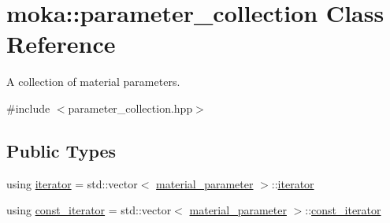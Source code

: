 \hypertarget{classmoka_1_1parameter__collection}{}\section{moka\+::parameter\+\_\+collection Class Reference}
\label{classmoka_1_1parameter__collection}


A collection of material parameters.  




{\ttfamily \#include $<$parameter\+\_\+collection.\+hpp$>$}

\subsection*{Public Types}
\begin{DoxyCompactItemize}
\item 
using \mbox{\hyperlink{classmoka_1_1parameter__collection_a2ec8bed3c1d7de9e5c2199ede27aa919}{iterator}} = std\+::vector$<$ \mbox{\hyperlink{structmoka_1_1material__parameter}{material\+\_\+parameter}} $>$\+::\mbox{\hyperlink{classmoka_1_1parameter__collection_a2ec8bed3c1d7de9e5c2199ede27aa919}{iterator}}
\item 
using \mbox{\hyperlink{classmoka_1_1parameter__collection_a6d2ad87d4e43742300cb9ded3beee731}{const\+\_\+iterator}} = std\+::vector$<$ \mbox{\hyperlink{structmoka_1_1material__parameter}{material\+\_\+parameter}} $>$\+::\mbox{\hyperlink{classmoka_1_1parameter__collection_a6d2ad87d4e43742300cb9ded3beee731}{const\+\_\+iterator}}
\end{DoxyCompactItemize}
